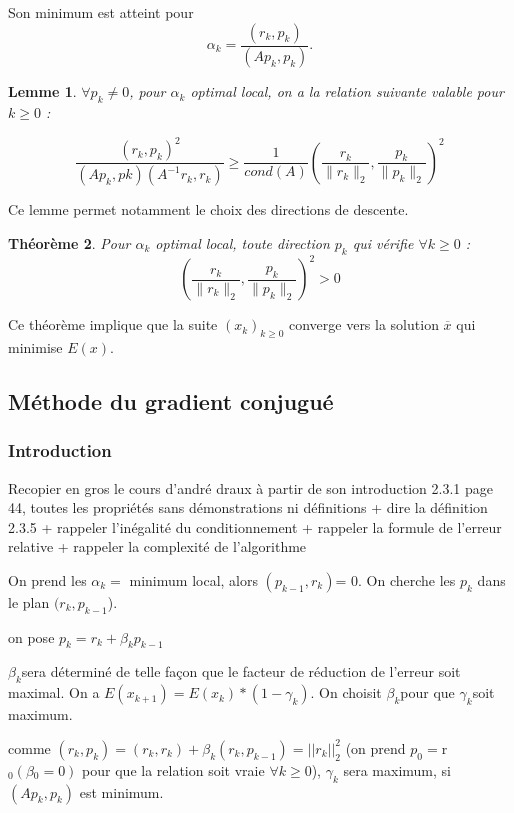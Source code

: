 \documentclass[12,french]{report}
\newtheorem{theorem}{Théorème}[chapter]
\newtheorem{lemma}[theorem]{Lemme}
\begin{document}
Son minimum est atteint pour
$$\alpha_{k}=\frac{(r_{k},p_{k})}{(Ap_{k},p_{k})}.$$



\begin{lemma}
	$\forall p_{k}\neq0$, pour $\alpha_{k}$ optimal local, on a la relation suivante valable pour $k\geq0$ :
	
$$\frac{(r_{k},p_{k})^{2}}{(Ap_{k},p{k})(A^{-1}r_{k},r_{k})}\geq\frac{1}{cond(A)}\left(\frac{r_{k}}{\|r_{k}\|_{2}},\frac{p_{k}}{\|p_{k}\|_{2}}\right)^{2}$$
\end{lemma}
Ce lemme permet notamment le choix des directions de descente.

\begin{theorem}
Pour $\alpha_{k}$ optimal local, toute direction $p_{k}$ qui vérifie $\forall k\geq0$ :
$$\left(\frac{r_{k}}{\|r_{k}\|_{2}},\frac{p_{k}}{\|p_{k}\|_{2}}\right)^{2}>0$$
\end{theorem}
Ce théorème implique que la suite $(x_{k})_{k\geq0}$ converge vers la solution $\overline{x}$ qui minimise $E(x)$.

\subsection{Méthode du gradient conjugué}
\subsubsection{Introduction}

Recopier en gros le cours d'andré draux à partir de son introduction 2.3.1 page 44, 
toutes les propriétés sans démonstrations ni définitions + dire la définition 2.3.5 + rappeler l'inégalité du conditionnement + rappeler la formule de l'erreur relative + rappeler la complexité de l'algorithme

On prend les $\alpha_{k}=$ minimum local, alors $(p_{k-1},r_{k})$=
0. On cherche les $p_{k}$ dans le plan $(r_{k},p_{k-1}$).

on pose $p_{k}=r_{k}+\beta_{k}p_{k-1}$

$\beta_{k}$sera déterminé de telle façon que le facteur de réduction
de l'erreur soit maximal. On a $E(x_{k+1})=E(x_{k})*(1-\gamma_{k}).$
On choisit $\beta_{k}$pour que $\gamma_{k}$soit maximum.

comme $(r_{k},p_{k})=(r_{k},r_{k})+\beta_{k}(r_{k},p_{k-1})=||r_{k}||_{2}^{2}$ (on
prend $p_{0}=$r$_{0}(\beta{}_{0}=0)$ pour que la relation soit vraie
$\forall k\geq0$), $\gamma_{k}$ sera maximum, si $(Ap_{k},p_{k})$
est minimum.
\end{document}
